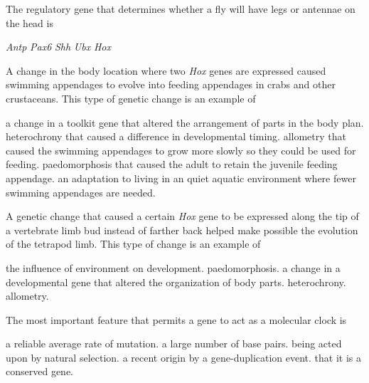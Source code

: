 \question
The regulatory gene that determines whether a fly will have legs or antennae on the head is

\begin{choices}
\correctchoice \textit{Antp} %
\choice \textit{Pax6} %
\choice \textit{Shh} %
\choice \textit{Ubx} %
\choice \textit{Hox} %
\end{choices}


\question
A change in the body location where two \textit{Hox} genes are expressed caused swimming appendages to evolve into feeding appendages in crabs and other crustaceans. This type of genetic change is an example of

\begin{choices}
\correctchoice a change in a toolkit gene that altered the arrangement of parts in the body plan. %
\choice heterochrony that caused a difference in developmental timing. %
\choice allometry that caused the swimming appendages to grow more slowly so they could be used for feeding. %
\choice paedomorphosis that caused the adult to retain the juvenile feeding appendage. %
\choice an adaptation to living in an quiet aquatic environment where fewer swimming appendages are needed. %
\end{choices}



\question
A genetic change that caused a certain \textit{Hox} gene to be expressed along the tip of a vertebrate limb bud instead of farther back helped make possible the  evolution of the tetrapod limb. This type of change is an example of 
\begin{choices}
\choice the influence of environment on development.%
\choice paedomorphosis.%
\correctchoice a change in a developmental gene that altered the organization of body parts.%
\choice heterochrony.%
\choice allometry.%
\end{choices}

\question
The most important feature that permits a gene to act as a molecular clock is 

\begin{choices}
\correctchoice a reliable average rate of mutation. %
\choice a large number of base pairs. %
\choice being acted upon by natural selection. %
\choice a recent origin by a gene-duplication event. %
\choice that it is a conserved gene. %
\end{choices}

